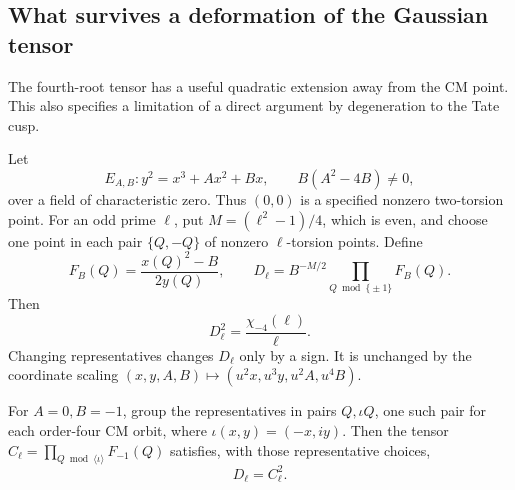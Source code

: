 \subsection{What survives a deformation of the Gaussian tensor}

The fourth-root tensor has a useful quadratic extension away
from the CM point.  This also specifies a limitation of a
direct argument by degeneration to the Tate cusp.

\begin{proposition}\label{prop:generic-elliptic-division-norm}
Let
\[
 E_{A,B}:y^2=x^3+Ax^2+Bx,\qquad B(A^2-4B)\ne0,
\]
over a field of characteristic zero.  Thus \((0,0)\) is a
specified nonzero two-torsion point.  For an odd prime
\(\ell\), put \(M=(\ell^2-1)/4\), which is even, and
choose one point in each pair \(\{Q,-Q\}\) of nonzero
\(\ell\)-torsion points.  Define
\[
 F_B(Q)=\frac{x(Q)^2-B}{2y(Q)},\qquad
 D_\ell=B^{-M/2}\prod_{Q\bmod\{\pm1\}}F_B(Q).
\]
Then
\begin{equation}\label{eq:generic-elliptic-norm-square}
                          D_\ell^2=\frac{\chi_{-4}(\ell)}{\ell}.
\end{equation}
Changing representatives changes \(D_\ell\) only by a sign.
It is unchanged by the coordinate scaling
\((x,y,A,B)\mapsto(u^2x,u^3y,u^2A,u^4B)\).

For \(A=0,B=-1\), group the representatives in pairs
\(Q,\iota Q\), one such pair for each order-four CM orbit,
where \(\iota(x,y)=(-x,iy)\).  Then the tensor
\(C_\ell=\prod_{Q\bmod\langle\iota\rangle}F_{-1}(Q)\)
satisfies, with those representative choices,
\begin{equation}\label{eq:quadratic-norm-is-square-of-cm-norm}
                                  D_\ell=C_\ell^2.
\end{equation}
\end{proposition}
